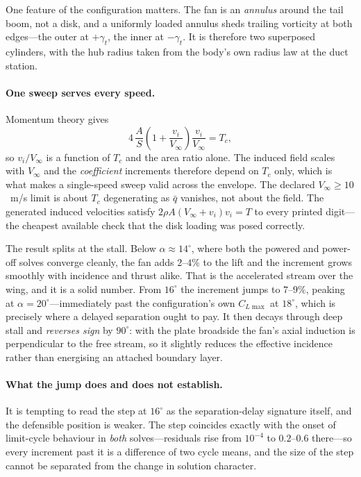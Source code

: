 \documentclass[11pt,a4paper]{article}
\newcommand{\dg}{^\circ}
\begin{document}
One feature of the configuration matters. The fan is an \emph{annulus}
around the tail boom, not a disk, and a uniformly loaded annulus sheds
trailing vorticity at both edges---the outer at $+\gamma_t$, the inner at
$-\gamma_t$. It is therefore two superposed cylinders, with the hub
radius taken from the body's own radius law at the duct station.

\paragraph{One sweep serves every speed.} Momentum theory gives
\begin{equation}
4\,\frac{A}{S}\left(1 + \frac{v_i}{V_\infty}\right)
\frac{v_i}{V_\infty} = T_c ,
\label{eq:tcsimilarity}
\end{equation}
so $v_i/V_\infty$ is a function of $T_c$ and the area ratio alone. The
induced field scales with $V_\infty$ and the \emph{coefficient}
increments therefore depend on $T_c$ only, which is what makes a
single-speed sweep valid across the envelope. The declared
$V_\infty \geq 10$~m/s limit is about $T_c$ degenerating as $\bar q$
vanishes, not about the field. The generated induced velocities satisfy
$2\rho A (V_\infty + v_i) v_i = T$ to every printed digit---the cheapest
available check that the disk loading was posed correctly.



\noindent
The result splits at the stall. Below $\alpha \approx 14\dg$, where both
the powered and power-off solves converge cleanly, the fan adds
$2$--$4\%$ to the lift and the increment grows smoothly with incidence
and thrust alike. That is the accelerated stream over the wing, and it is
a solid number. From $16\dg$ the increment jumps to $7$--$9\%$, peaking
at $\alpha = 20\dg$---immediately past the configuration's own
$C_{L\max}$ at $18\dg$, which is precisely where a delayed separation
ought to pay. It then decays through deep stall and \emph{reverses sign}
by $90\dg$: with the plate broadside the fan's axial induction is
perpendicular to the free stream, so it slightly reduces the effective
incidence rather than energising an attached boundary layer.

\paragraph{What the jump does and does not establish.} It is tempting to
read the step at $16\dg$ as the separation-delay signature itself, and
the defensible position is weaker. The step coincides exactly with the
onset of limit-cycle behaviour in \emph{both} solves---residuals rise
from $10^{-4}$ to $0.2$--$0.6$ there---so every increment past it is a
difference of two cycle means, and the size of the step cannot be
separated from the change in solution character.
\end{document}
